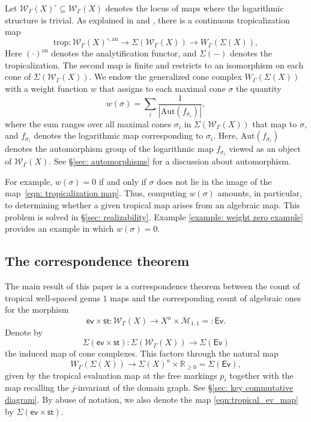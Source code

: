 \documentclass{article}
\def\Ev{{\mathsf{Ev}}}
\def\cW{\mathcal{W}}
\def\WG{\mathcal{W}_{\Gamma}}
\begin{document}
Let $\WG(X)^{\circ} \subseteq \WG(X)$ denotes the locus of maps where the logarithmic structure is trivial. As explained in \cite[Theorem~7.14]{ACMUW} and \cite[Theorem~4.6.2]{RSWII}, there is a continuous tropicalization map
\begin{equation}\label{eqn: tropicalization map}
\mathrm{trop} \colon \WG(X)^{\circ, \mathrm{an}}\longrightarrow {\Sigma}({\WG(X)} )
\to W_{\Gamma}(\Sigma(X)) ,
\end{equation}
Here $(\cdot)^{\mathrm{an}}$ denotes the analytification functor, and $\Sigma(-)$ denotes the tropicalization.
The second map is finite and restricts to an isomorphism on each cone of $\Sigma(\WG(X))$. 
We endow the generalized cone complex $W_{\Gamma}(\Sigma(X))$ with a weight function $w$ that assigns to each maximal cone $\sigma$ the quantity
$$
w(\sigma)= \sum_i \frac{1}{|\mathrm{Aut}(f_{\sigma_i})|},
$$
where the sum ranges over all maximal cones $\sigma_i$ in $\Sigma(\cW_{\Gamma}(X))$ that map to $\sigma$, and $f_{\sigma_i}$ denotes the logarithmic map corresponding to $\sigma_i$. Here, $\mathrm{Aut}(f_{\sigma_i})$ denotes the automorphism group of the logarithmic map $f_{\sigma_i}$ viewed as an object of $\cW_{\Gamma}(X)$. See \S\ref{sec: automorphisms} for a discussion about automorphism.

For example, $w(\sigma)=0$ if and only if $\sigma$ does not lie in the image of the map~\eqref{eqn: tropicalization map}. Thus, computing $w(\sigma)$ amounts, in particular, to determining whether a given tropical map arises from an algebraic map. This problem is solved in \S\ref{sec: realizability}. Example \ref{example: weight zero example} provides an example in which $w(\sigma)=0$.





\subsection{The correspondence theorem}

The main result of this paper is a correspondence theorem between the count of tropical well-spaced genus $1$ maps and the corresponding count of algebraic ones for the morphism
\begin{equation}\label{eqn: map}
\mathsf{ev} \times \mathsf{st} \colon \WG(X) \longrightarrow X^n \times  \overline{\mathcal{M}}_{1,1}=: \Ev.
\end{equation}
Denote by
\[
\Sigma(\mathsf{ev} \times \mathsf{st}) \colon 
\Sigma(\WG(X)) \longrightarrow \Sigma(\Ev)
\]
the induced map of cone complexes. This factors through the natural map
\begin{equation}\label{eqn:tropical_ev_map}
W_{\Gamma}(\Sigma(X)) \longrightarrow \Sigma(X)^n \times \mathbb{R}_{\ge 0}= \Sigma(\Ev),
\end{equation}
given by the tropical evaluation map at the free markings $p_i$ together with the map recalling the $j$-invariant of the domain graph. See \S\ref{sec: key commutative diagram}. By abuse of notation, we also denote the map \eqref{eqn:tropical_ev_map} by $\Sigma(\mathsf{ev} \times \mathsf{st})$. 
\end{document}

